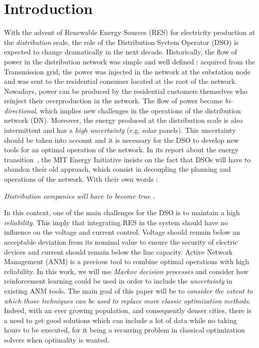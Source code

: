 \section{Introduction}
\label{sec:intro}
With the advent of Renewable Energy Sources (RES) for electricity production at the \emph{distribution} scale, the role of the Distribution System Operator (DSO) is expected to change dramatically in the next decade.
Historically, the flow of power in the distribution network was simple and well defined : acquired from the Transmission grid, the power was injected in the network at the substation node and was sent to the residential consumer located at the root of the network.
Nowadays, power can be produced by the residential customers themselves who reinject their overproduction in the network.
The flow of power became \emph{bi-directional}, which implies new challenges in the operations of the distribution network (DN).
Moreover, the energy produced at the distribution scale is also intermittent and has a \emph{high uncertainty}
(e.g. solar panels).
This uncertainty should be taken into account and it is necessary for the DSO to develop new tools for an optimal operation of the network.
In its report about the energy transition~\cite{utility}, the MIT Energy Initiative insists on the fact that DSOs will have to abandon their old  approach, which consist in decoupling the planning and operations of the network.
With their own words :
\begin{displayquote}
\emph{Distribution companies will have to become true .}
\end{displayquote}

In this context, one of the main challenges for the DSO is to maintain a high \emph{reliability}.
This imply that integrating RES in the system should have no influence on the voltage and current control.
Voltage should remain below an acceptable deviation from its nominal value to ensure the security of electric devices and current should remain below the line capacity.
Active Network Management (ANM) is a precious tool to combine optimal operations with high reliability.
In this work, we will use \emph{Markov decision processes} and consider how
reinforcement learning could be used in order
to include the \emph{uncertainty} in existing ANM tools.
The main goal of this paper will be to \emph{consider the extent to which those techniques
can be used to replace more classic optimization methods}.
Indeed, with an ever growing population, and consequently denser cities,
there is a need to get good solutions
which can include a lot of data while no taking hours to be executed,
for it being a recurring problem in classical optimization solvers when
optimality is wanted.

